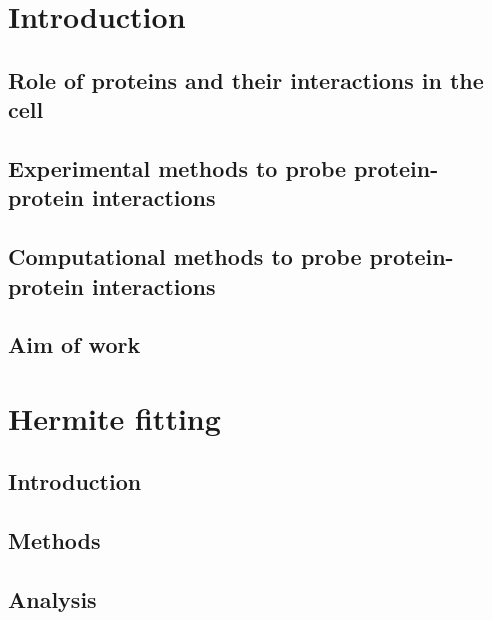 \documentclass[12pt,twoside]{report}
\begin{document}
\tableofcontents


\newpage
\chapter{Introduction}

  \section{Role of proteins and their interactions in the cell}
  
  
  \newpage
  
  \section{Experimental methods to probe protein-protein interactions}
  
  
  \newpage
  
  \section{Computational methods to probe protein-protein interactions}
  
  
  \newpage
  
  \section{Aim of work}
  
   
\newpage
\chapter{Hermite fitting}

  \section{Introduction}
  

  \newpage
  
  \section{Methods}
  

  \newpage
  
  \section{Analysis}
  
  
\end{document}
